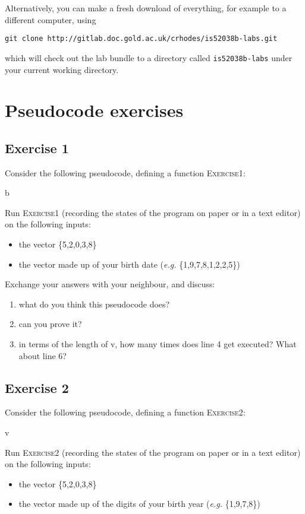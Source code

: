 \documentclass[11pt]{article}
\begin{document}
Alternatively, you can make a fresh download of everything, for
example to a different computer, using
\begin{verbatim}
git clone http://gitlab.doc.gold.ac.uk/crhodes/is52038b-labs.git
\end{verbatim}
which will check out the lab bundle to a directory called
\texttt{is52038b-labs} under your current working directory.
\clearpage
\section{Pseudocode exercises}
\label{sec:orge6522a7}
\subsection{Exercise 1}
\label{sec:orgfc23fbd}
Consider the following pseudocode, defining a function \textsc{Exercise1}:
\begin{algorithmic}[1]
  \Else
  \EndIf
  \EndIf
  \EndFor
  \State \Return b
  \EndFunction
\end{algorithmic}
Run \textsc{Exercise1} (recording the states of the program on
paper or in a text editor) on the following inputs:
\begin{itemize}
\item the vector \{5,2,0,3,8\}
\item the vector made up of your birth date (\emph{e.g.} \{1,9,7,8,1,2,2,5\})
\end{itemize}

\noindent Exchange your answers with your neighbour, and discuss:
\begin{enumerate}
\item what do you think this pseudocode does?
\item can you prove it?
\item in terms of the length of v, how many times does line 4 get
executed?  What about line 6?
\end{enumerate}
\clearpage
\subsection{Exercise 2}
\label{sec:org8da2c20}
Consider the following pseudocode, defining a function
\textsc{Exercise2}:
\begin{algorithmic}[1]
  \State \Break
  \EndIf
  \EndWhile
  \EndFor
  \State \Return v
  \EndFunction
\end{algorithmic}
Run \textsc{Exercise2} (recording the states of the program on
paper or in a text editor) on the following inputs:
\begin{itemize}
\item the vector \{5,2,0,3,8\}
\item the vector made up of the digits of your birth year (\emph{e.g.} \{1,9,7,8\})
\end{itemize}
\end{document}
